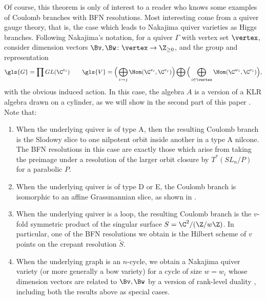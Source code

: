 Of course, this theorem is only of interest to a reader who knows some
examples of Coulomb branches with BFN resolutions.  Most interesting
come from a quiver gauge theory, that is,
the case which leads to Nakajima quiver varieties as Higgs branches.
Following Nakajima's notation, for a quiver $\Gamma$ with vertex set $\vertex$,
consider dimension vectors $\Bv,\Bw\colon \vertex\to \Z_{\geq 0}$, and
the group and representation
\begin{equation}
\gls{G}=\prod GL(\C^{v_i})\qquad \gls{V}=\Big(\bigoplus_{i\to j}
\Hom(\C^{v_i},\C^{v_j})\Big)\bigoplus \Big(\bigoplus_{i\in {\vertex}}
  \Hom(\C^{w_i},\C^{v_i}) \Big),\label{eq:quiver-gauge}
\end{equation}
  with the obvious induced action.  In this
case, the algebra $A$ is a version of a KLR algebra drawn on a
cylinder, as we will show in the second part of this paper \cite{WebcohII}.  Note
that:
\begin{enumerate}
\item When the underlying quiver is of type A, then the resulting
  Coulomb branch is the Slodowy slice to one nilpotent orbit inside
  another in a type A nilcone.  The BFN resolutions in this case are
  exactly those which arise from taking the preimage under a
  resolution of the larger orbit closure by $T^*(SL_n/P)$ for a
  parabolic $P$. 
\item When the underlying quiver is of type D or E, the Coulomb branch is isomorphic to an affine Grassmannian slice, as shown in
  \cite[App. B]{BFNplus}.
\item When the underlying quiver is a loop, the resulting Coulomb
  branch is the $v$-fold symmetric product of the singular surface
  $S=\C^2/(\Z/w\Z)$.  In particular, one of the BFN resolutions we obtain
 is the Hilbert scheme of $v$ points on the crepant resolution $\tilde
 S$.  
\item When the underlying graph is an $n$-cycle, we
  obtain a Nakajima quiver variety (or more generally a bow variety) for a cycle of size $w=w_i$ whose
  dimension vectors are related to $\Bv,\Bw$ by a version of
  rank-level duality \cite{NTbow}, including both the results
  above as special cases.
\end{enumerate}


